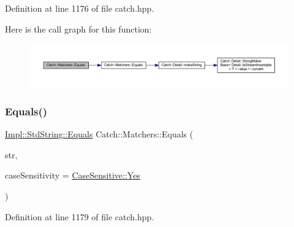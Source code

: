 Definition at line 1176 of file catch.\+hpp.

Here is the call graph for this function\+:\nopagebreak
\begin{figure}[H]
\begin{center}
\leavevmode
\includegraphics[width=350pt]{namespace_catch_1_1_matchers_a840317a3d0f828642c2f55155068bb97_cgraph}
\end{center}
\end{figure}
\hypertarget{namespace_catch_1_1_matchers_a7454444261cc4af7ee0b0bc82cf74284}{}\label{namespace_catch_1_1_matchers_a7454444261cc4af7ee0b0bc82cf74284} 
\subsubsection{\texorpdfstring{Equals()}{Equals()}\hspace{0.1cm}{\footnotesize\ttfamily [2/2]}}
{\footnotesize\ttfamily \hyperlink{struct_catch_1_1_matchers_1_1_impl_1_1_std_string_1_1_equals}{Impl\+::\+Std\+String\+::\+Equals} Catch\+::\+Matchers\+::\+Equals (\begin{DoxyParamCaption}\item[{const char $\ast$}]{str,  }\item[{\hyperlink{struct_catch_1_1_case_sensitive_aad49d3aee2d97066642fffa919685c6a}{Case\+Sensitive\+::\+Choice}}]{case\+Sensitivity = {\ttfamily \hyperlink{struct_catch_1_1_case_sensitive_aad49d3aee2d97066642fffa919685c6aa7c5550b69ec3c502e6f609b67f9613c6}{Case\+Sensitive\+::\+Yes}} }\end{DoxyParamCaption})\hspace{0.3cm}{\ttfamily [inline]}}



Definition at line 1179 of file catch.\+hpp.

